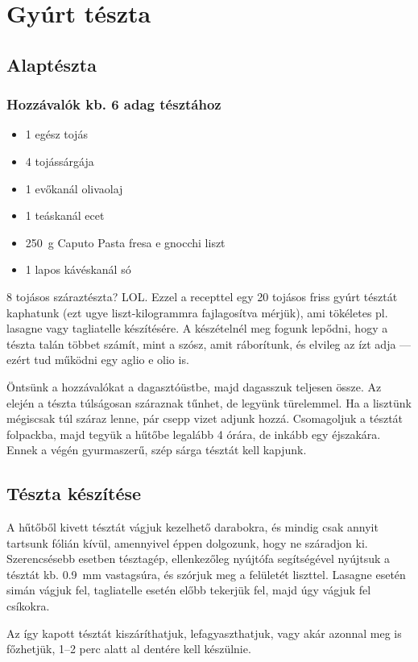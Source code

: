\newpage
\section*{Gyúrt tészta}

\subsection*{Alaptészta}
\subsubsection*{Hozzávalók kb. 6 adag tésztához}
\begin{itemize}
    \item \num{1} egész tojás
    \item \num{4} tojássárgája
    \item \num{1} evőkanál olivaolaj
    \item \num{1} teáskanál ecet
    \item \qty{250}{\g} Caputo Pasta fresa e gnocchi liszt
    \item \num{1} lapos kávéskanál só
\end{itemize}

\num{8} tojásos száraztészta? LOL. Ezzel a recepttel egy \num{20} tojásos friss gyúrt tésztát kaphatunk (ezt ugye liszt-kilogrammra fajlagosítva mérjük), ami tökéletes pl. lasagne vagy tagliatelle készítésére. A készételnél meg fogunk lepődni, hogy a tészta talán többet számít, mint a szósz, amit ráborítunk, és elvileg az ízt adja --- ezért tud működni egy aglio e olio is.

Öntsünk a hozzávalókat a dagasztóüstbe, majd dagasszuk teljesen össze. Az elején a tészta túlságosan száraznak tűnhet, de legyünk türelemmel. Ha a lisztünk mégiscsak túl száraz lenne, pár csepp vizet adjunk hozzá. Csomagoljuk a tésztát folpackba, majd tegyük a hűtőbe legalább \num{4} órára, de inkább egy éjszakára. Ennek a végén gyurmaszerű, szép sárga tésztát kell kapjunk.~\cite{szell_gyurt_teszta}

\subsection*{Tészta készítése}
A hűtőből kivett tésztát vágjuk kezelhető darabokra, és mindig csak annyit tartsunk fólián kívül, amennyivel éppen dolgozunk, hogy ne száradjon ki. Szerencsésebb esetben tésztagép, ellenkezőleg nyújtófa segítségével nyújtsuk a tésztát kb. \qty{0.9}{\mm} vastagsúra, és szórjuk meg a felületét liszttel. Lasagne esetén simán vágjuk fel, tagliatelle esetén előbb tekerjük fel, majd úgy vágjuk fel csíkokra.

Az így kapott tésztát kiszáríthatjuk, lefagyaszthatjuk, vagy akár azonnal meg is főzhetjük, \numrange{1}{2} perc alatt al dentére kell készülnie.
